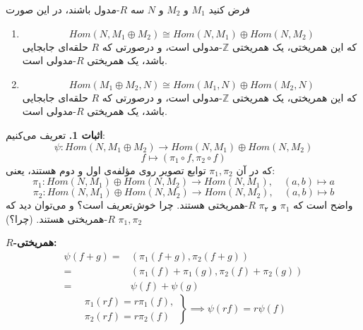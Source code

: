 \begin{frame}
    \begin{theorem}
        فرض کنید
        \(M_1\)
        و
        \(M_2\)
        و
        \(N\)
        سه
        \(R\)-مدول
        باشند، در این صورت
        \begin{enumerate}
            \item \[
                      Hom(N, M_1 \oplus M_2) \cong Hom(N,M_1) \oplus Hom(N,M_2)
                  \]
                  که این همریختی،‌ یک همریختی
                  \(\mathbb{Z}\)-مدولی
                  است، و درصورتی که
                  \(R\)
                  حلقه‌ای جابجایی باشد، یک همریختی
                  \(R\)-مدولی
                  است.
            \item \[
                      Hom(M_1 \oplus M_2, N) \cong Hom(M_1,N) \oplus Hom(M_2,N)
                  \]
                  که این همریختی،‌ یک همریختی
                  \(\mathbb{Z}\)-مدولی
                  است، و درصورتی که
                  \(R\)
                  حلقه‌ای جابجایی باشد، یک همریختی
                  \(R\)-مدولی
                  است.
        \end{enumerate}
    \end{theorem}
\end{frame}

\begin{frame}
    \textbf{اثبات 1.}   تعریف می‌کنیم:
    \[
        \psi : Hom(N, M_1 \oplus M_2) \to Hom(N, M_1) \oplus Hom(N, M_2)
    \]
    \[
        f \mapsto (\pi_1 \circ f, \pi_2 \circ f)
    \]
    که در آن \( \pi_1, \pi_2 \) توابع تصویر روی مؤلفه‌ی اول و دوم هستند، یعنی:
    \[
        \pi_1 : Hom(N,M_1) \oplus Hom(N,M_2) \to Hom(N,M_1), \quad (a,b) \mapsto a
    \]
    \[
        \pi_2 : Hom(N,M_1) \oplus Hom(N,M_2) \to Hom(N,M_2), \quad (a,b) \mapsto b
    \]
    واضح است که
    \(\pi_1\)
    و
    \(\pi_۲\)
    \(R\)-همریختی
    هستند. چرا خوش‌تعریف است؟
    و می‌توان دید که \( \pi_1, \pi_2 \) \( R \)-همریختی هستند. (چرا؟)

\end{frame}



\begin{frame}
    \textbf{\(R\)-همریختی:}
    \[
        \begin{aligned}
            \psi(f+g) = & (\pi_1(f+g), \pi_2(f+g))               \\
            =           & (\pi_1(f)+\pi_1(g), \pi_2(f)+\pi_2(g)) \\
            =           & \psi(f) + \psi(g)
        \end{aligned}
    \]
    \[
        \left.
        \begin{aligned}
            \pi_1(rf) = r\pi_1(f), \\
            \pi_2(rf) = r\pi_2(f)
        \end{aligned}
        \right\}
        \implies \psi(rf) = r \psi(f)
    \]

\end{frame}


